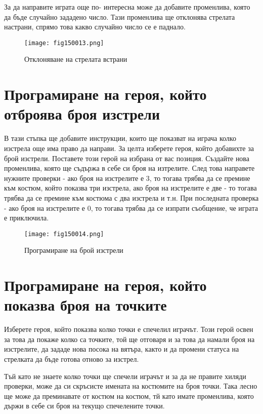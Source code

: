 За да направите играта още по- интересна може да добавите променлива, която да бъде случайно зададено число. Тази променлива ще отклонява стрелата настрани, спрямо това какво случайно число се е паднало.

\begin{figure}[H]
  \centering
  \texttt{[image: fig150013.png]}
  \caption{Отклоняване на стрелата встрани}
\label{fig150013}
\end{figure}

\section{Програмиране на героя, който отброява броя изстрели}

В тази стъпка ще добавите инструкции, които ще показват на играча колко изстрела още има право да направи. За целта изберете героя, който добавихте за брой изстрели. Поставете този герой на избрана от вас позиция. Създайте нова променлива, която ще съдържа в себе си броя на изтрелите. След това направете нужните проверки - ако броя на изстрелите е 3, то тогава трябва да се премине към костюм, който показва три изстрела, ако броя на изстрелите е две - то тогава трябва да се премине към костюма с два изстрела и т.н. При последната проверка - ако броя на изстрелите е 0, то тогава трябва да се изпрати съобщение, че играта е приключила.

\begin{figure}[H]
  \centering
  \texttt{[image: fig150014.png]}
  \caption{Програмиране на брой изстрели}
\label{fig150014}
\end{figure}

\section{Програмиране на героя, който показва броя на точките}

Изберете героя, който показва колко точки е спечелил играчът. Този герой освен за това да покаже колко са точките, той ще отговаря и за това да намали броя на изстрелите, да зададе нова посока на вятъра, както и да промени статуса на стрелката да бъде готова отново за изстрел.

Тъй като не знаете колко точки ще спечели играчът и за да не правите хиляди проверки, може да си скръсисте имената на костюмите на броя точки. Така лесно ще може да преминавате от костюм на костюм, тй като имате променлива, която държи в себе си броя на текущо спечелените точки.

